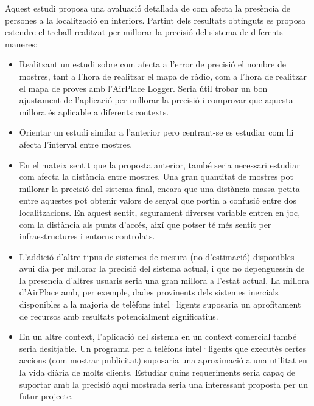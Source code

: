 
Aquest estudi proposa una avaluació detallada de com afecta la presència de persones a la localització en interiors. Partint dels resultats obtinguts es proposa estendre el treball realitzat per millorar la precisió del sistema de diferents maneres:

\begin{itemize}
    \item Realitzant un estudi sobre com afecta a l'error de precisió el nombre de mostres, tant a l'hora de realitzar el mapa de ràdio, com a l'hora de realitzar el mapa de proves amb l'AirPlace Logger. Seria útil trobar un bon ajustament de l'aplicació per millorar la precisió i comprovar que aquesta millora és aplicable a diferents contexts.
    \item Orientar un estudi similar a l'anterior pero centrant-se es estudiar com hi afecta l'interval entre mostres.
    \item En el mateix sentit que la proposta anterior, també seria necessari estudiar com afecta la distància entre mostres. Una gran quantitat de mostres pot millorar la precisió del sistema final, encara que una distància massa petita entre aquestes pot obtenir valors de senyal que portin a confusió entre dos localitzacions. En aquest sentit, segurament diverses variable entren en joc, com la distància als punts d'accés, així que potser té més sentit per infraestructures i entorns controlats.
    \item L'addició d'altre tipus de sistemes de mesura (no d'estimació) disponibles avui dia per millorar la precisió del sistema actual, i que no depenguessin de la presencia d'altres usuaris seria una gran millora a l'estat actual. La millora d'AirPlace amb, per exemple, dades provinents dels sistemes inercials disponibles a la majoria de telèfons intel·ligents suposaria un aprofitament de recursos amb resultats potencialment significatius.
    \item En un altre context, l'aplicació del sistema en un context comercial també seria desitjable. Un programa per a telèfons intel·ligents que executés certes accions (com mostrar publicitat) suposaria una aproximació a una utilitat en la vida diària de molts clients. Estudiar quins requeriments seria capaç de suportar amb la precisió aquí mostrada seria una interessant proposta per un futur projecte.
\end{itemize}
